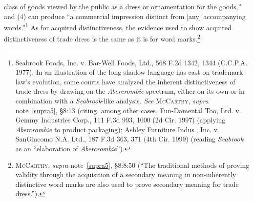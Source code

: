 \documentclass[letterpaper, 11pt, oneside]{article}
\begin{document}
class of goods viewed by the public as a dress or ornamentation for the goods,'' and (4) can produce ``a commercial impression distinct from [any] accompanying words.''\footnote{Seabrook Foods, Inc. v. Bar-Well Foods, Ltd., 568 F.2d 1342, 1344 (C.C.P.A. 1977). In an illustration of the long shadow language has cast on trademark law's evolution, some courts have analyzed the inherent distinctiveness of trade dress by drawing on the \textit{Abercrombie} spectrum, either on its own or in combination with a \textit{Seabrook}-like analysis. \textit{See} \textsc{McCarthy}, \textit{supra} note~\ref{supra5}, \S 8:13 (citing, among other cases, Fun-Damental Too, Ltd. v. Gemmy Industries Corp., 111 F.3d 993, 1000 (2d Cir. 1997) (applying \textit{Abercrombie} to product packaging); Ashley Furniture Indus., Inc. v. SanGiacomo N.A. Ltd., 187 F.3d 363, 371 (4th Cir. 1999) (reading \textit{Seabrook} as an ``elaboration of \textit{Abercrombie}'').} As for acquired distinctiveness, the evidence used to show acquired distinctiveness of trade dress is the same as it is for word marks.\footnote{\textsc{McCarthy}, \textit{supra} note~\ref{supra5}, \S 8:8:50 (``The traditional methods of proving validity through the acquisition of a secondary meaning in non-inherently distinctive word marks are also used to prove secondary meaning for trade dress.'').}
\end{document}
